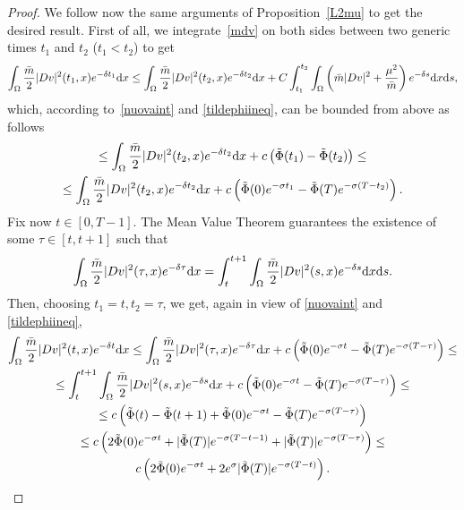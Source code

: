 \documentclass[10pt,a4paper,nouppercase,nowrite]{article}
\numberwithin{equation}{section}
\newcommand{\di}{{\rm d}}
\theoremstyle{definition}
\begin{document}
\begin{proof}
		We follow now the same arguments of Proposition~\ref{L2mu} to get the desired result. First of all, we integrate~\eqref{mdv} on both sides between two generic times $t_1$ and $t_2$ ($t_1 < t_2$) to get
		\begin{equation*}
			\int_{\Omega} \frac{\bar{m}}{2} |Dv|^2(t_1,x) e^{-\delta t_1} \di x \le \int_{\Omega} \frac{\bar{m}}{2} |Dv|^2(t_2,x) e^{-\delta t_2} \di x + C \int_{t_1}^{t_2} \int_{\Omega} \left( \bar{m}|Dv|^2 + \frac{\mu^2}{\bar{m}} \right) e^{-\delta s} \di x \di s,
		\end{equation*}
		which, according to~\eqref{nuovaint} and \eqref{tildephiineq}, can be bounded from above as follows
		\begin{multline*}
			\le \int_{\Omega} \frac{\bar{m}}{2} |Dv|^2(t_2,x) e^{-\delta t_2} \di x + c\left( \tilde{\Phi}(t_1) - \tilde{\Phi}(t_2) \right) \le \\
			\le \int_{\Omega} \frac{\bar{m}}{2} |Dv|^2(t_2,x) e^{-\delta t_2} \di x + c \left( \tilde{\Phi}(0) e^{-\sigma t_1} - \tilde{\Phi}(T) e^{-\sigma(T-t_2)} \right).
		\end{multline*}
		Fix now $t \in [0,T-1]$. The Mean Value Theorem guarantees the existence of some $\tau \in [t,t+1]$ such that
		\begin{equation*}
			\int_{\Omega} \frac{\bar{m}}{2} |Dv|^2(\tau,x) e^{-\delta \tau} \di x = \int_{t}^{t+1} \int_{\Omega} \frac{\bar{m}}{2} |Dv|^2(s,x) e^{-\delta s} \di x \di s.
		\end{equation*}
		Then, choosing $t_1=t, t_2=\tau$, we get, again in view of \eqref{nuovaint} and \eqref{tildephiineq}, 
		\begin{multline*}
			\int_{\Omega} \frac{\bar{m}}{2} |Dv|^2(t,x) e^{-\delta t} \di x \le \int_{\Omega} \frac{\bar{m}}{2} |Dv|^2(\tau,x) e^{-\delta \tau} \di x + c \left( \tilde{\Phi}(0) e^{-\sigma t} - \tilde{\Phi}(T) e^{-\sigma(T-\tau)} \right) \le \\
			\le \int_t^{t+1} \int_{\Omega} \frac{\bar{m}}{2} |Dv|^2(s,x) e^{-\delta s} \di x + c \left( \tilde{\Phi}(0) e^{-\sigma t} - \tilde{\Phi}(T) e^{-\sigma(T-\tau)} \right) \le \\
			\le c \left(\tilde{\Phi}(t) - \tilde{\Phi}(t+1)+ \tilde{\Phi}(0) e^{-\sigma t} - \tilde{\Phi}(T) e^{-\sigma(T-\tau)} \right) \\ \le c \left( 2\tilde{\Phi}(0) e^{-\sigma t} + |\tilde{\Phi}(T)| e^{-\sigma(T-t-1)} + |\tilde{\Phi}(T)|e^{-\sigma(T-\tau)} \right) \le \\ c\left( 2\tilde{\Phi}(0) e^{-\sigma t} + 2e^\sigma |\tilde{\Phi}(T)| e^{-\sigma(T-t)} \right).

\end{multline*}
\end{proof}
\end{document}
